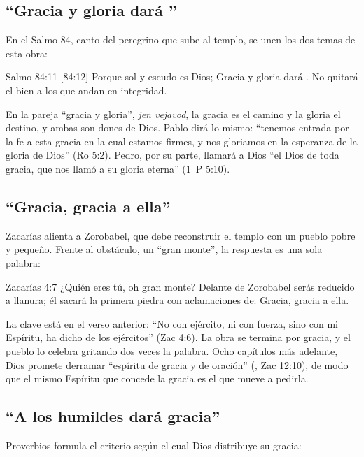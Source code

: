 \subsection{“Gracia y gloria dará \SENOR”}
En el Salmo 84, canto del peregrino que sube al templo, se unen los dos temas de esta obra:

\begin{verso}{Salmo 84:11 [84:12]}
Porque sol y escudo es \SENOR{} Dios; Gracia y gloria dará \SENOR. No quitará el bien a los que andan en integridad.
\end{verso}

En la pareja ``gracia y gloria'', \emph{jen vejavod}, la gracia es el camino y la gloria el destino, y ambas son dones de Dios. Pablo dirá lo mismo: ``tenemos entrada por la fe a esta gracia en la cual estamos firmes, y nos gloriamos en la esperanza de la gloria de Dios'' (Ro 5:2). Pedro, por su parte, llamará a Dios ``el Dios de toda gracia, que nos llamó a su gloria eterna'' (1~P 5:10).

\subsection{“Gracia, gracia a ella”}
Zacarías alienta a Zorobabel, que debe reconstruir el templo con un pueblo pobre y pequeño. Frente al obstáculo, un ``gran monte'', la respuesta es una sola palabra:

\begin{verso}{Zacarías 4:7}
¿Quién eres tú, oh gran monte? Delante de Zorobabel serás reducido a llanura; él sacará la primera piedra con aclamaciones de: Gracia, gracia a ella.
\end{verso}

La clave está en el verso anterior: ``No con ejército, ni con fuerza, sino con mi Espíritu, ha dicho \SENOR{} de los ejércitos'' (Zac 4:6). La obra se termina por gracia, y el pueblo lo celebra gritando dos veces la palabra. Ocho capítulos más adelante, Dios promete derramar ``espíritu de gracia y de oración'' (, Zac 12:10), de modo que el mismo Espíritu que concede la gracia es el que mueve a pedirla.

\subsection{“A los humildes dará gracia”}
Proverbios formula el criterio según el cual Dios distribuye su gracia:

